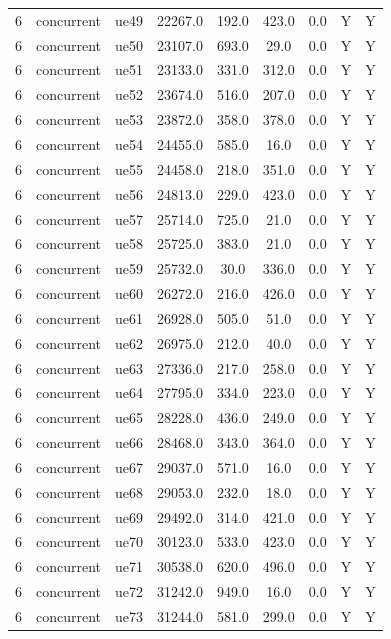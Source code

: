 \begin{table}[ht]
\begin{tabular}{|c|c|c|c|c|c|c|c|c|}
6 & concurrent & ue49 & 22267.0 & 192.0 & 423.0 & 0.0 & Y & Y \\
6 & concurrent & ue50 & 23107.0 & 693.0 & 29.0 & 0.0 & Y & Y \\
6 & concurrent & ue51 & 23133.0 & 331.0 & 312.0 & 0.0 & Y & Y \\
6 & concurrent & ue52 & 23674.0 & 516.0 & 207.0 & 0.0 & Y & Y \\
6 & concurrent & ue53 & 23872.0 & 358.0 & 378.0 & 0.0 & Y & Y \\
6 & concurrent & ue54 & 24455.0 & 585.0 & 16.0 & 0.0 & Y & Y \\
6 & concurrent & ue55 & 24458.0 & 218.0 & 351.0 & 0.0 & Y & Y \\
6 & concurrent & ue56 & 24813.0 & 229.0 & 423.0 & 0.0 & Y & Y \\
6 & concurrent & ue57 & 25714.0 & 725.0 & 21.0 & 0.0 & Y & Y \\
6 & concurrent & ue58 & 25725.0 & 383.0 & 21.0 & 0.0 & Y & Y \\
6 & concurrent & ue59 & 25732.0 & 30.0 & 336.0 & 0.0 & Y & Y \\
6 & concurrent & ue60 & 26272.0 & 216.0 & 426.0 & 0.0 & Y & Y \\
6 & concurrent & ue61 & 26928.0 & 505.0 & 51.0 & 0.0 & Y & Y \\
6 & concurrent & ue62 & 26975.0 & 212.0 & 40.0 & 0.0 & Y & Y \\
6 & concurrent & ue63 & 27336.0 & 217.0 & 258.0 & 0.0 & Y & Y \\
6 & concurrent & ue64 & 27795.0 & 334.0 & 223.0 & 0.0 & Y & Y \\
6 & concurrent & ue65 & 28228.0 & 436.0 & 249.0 & 0.0 & Y & Y \\
6 & concurrent & ue66 & 28468.0 & 343.0 & 364.0 & 0.0 & Y & Y \\
6 & concurrent & ue67 & 29037.0 & 571.0 & 16.0 & 0.0 & Y & Y \\
6 & concurrent & ue68 & 29053.0 & 232.0 & 18.0 & 0.0 & Y & Y \\
6 & concurrent & ue69 & 29492.0 & 314.0 & 421.0 & 0.0 & Y & Y \\
6 & concurrent & ue70 & 30123.0 & 533.0 & 423.0 & 0.0 & Y & Y \\
6 & concurrent & ue71 & 30538.0 & 620.0 & 496.0 & 0.0 & Y & Y \\
6 & concurrent & ue72 & 31242.0 & 949.0 & 16.0 & 0.0 & Y & Y \\
6 & concurrent & ue73 & 31244.0 & 581.0 & 299.0 & 0.0 & Y & Y \\

\end{tabular}
\end{table}
